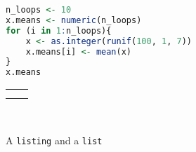 \documentclass[10pt,]{article}
\theoremstyle{plain}
\theoremstyle{definition}
\theoremstyle{definition}
\theoremstyle{definition}
\theoremstyle{definition}
\theoremstyle{definition}
\theoremstyle{definition}
\numberwithin{equation}{section}
\newlength{\panelmax}
\begin{document}
\begin{figure}
\centering
{%
\setlength{\panelmax}{0pt}
\ifdefined\panelboxAprogram\else\newsavebox{\panelboxAprogram}\fi%
\begin{lrbox}{\panelboxAprogram}
\begin{lstlisting}[style=genericinput, language=R, linewidth=0.4\linewidth]
n_loops <- 10
x.means <- numeric(n_loops)
for (i in 1:n_loops){
    x <- as.integer(runif(100, 1, 7))
    x.means[i] <- mean(x)
}
x.means
\end{lstlisting}
\end{lrbox}
\ifdefined\phAprogram\else\newlength{\phAprogram}\fi%
\setlength{\phAprogram}{\ht\panelboxAprogram+\dp\panelboxAprogram}
\settototalheight{\phAprogram}{\usebox{\panelboxAprogram}}
\setlength{\panelmax}{\maxof{\panelmax}{\phAprogram}}
\ifdefined\panelboxAlist\else\newsavebox{\panelboxAlist}\fi%
\ifdefined\phAlist\else\newlength{\phAlist}\fi%
\setlength{\phAlist}{\ht\panelboxAlist+\dp\panelboxAlist}
\settototalheight{\phAlist}{\usebox{\panelboxAlist}}
\setlength{\panelmax}{\maxof{\panelmax}{\phAlist}}
\leavevmode%
\setlength{\tabcolsep}{0.025\linewidth}
\par\medskip\noindent
\hspace*{0.05\linewidth}%
\begin{tabular}{@{}*{2}{c}@{}}
\begin{minipage}[c][\panelmax][t]{0.4\linewidth}\usebox{\panelboxAprogram}\end{minipage}&
\begin{minipage}[c][\panelmax][t]{0.45\linewidth}\usebox{\panelboxAlist}\end{minipage}\tabularnewline
\parbox[t]{0.4\linewidth}{
}&
\parbox[t]{0.45\linewidth}{
}\end{tabular}\\
}%
\caption{A \lstinline?listing? and a \lstinline?list?\label{figure-122}}
\end{figure}
\end{document}
